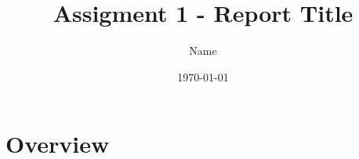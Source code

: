 \documentclass{ethz_report}
\title{Assigment 1 - Report Title}
\author{Name}
\date{\today}
\begin{document}
\maketitle

\section{Overview}
\blindtext
\end{document}
